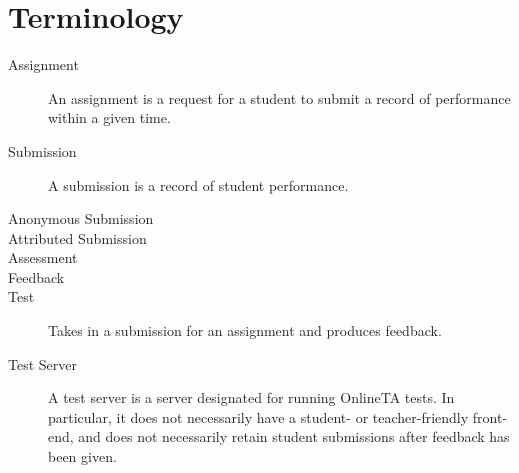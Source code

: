 \section{Terminology}

\begin{description}

\item[Assignment] An assignment is a request for a student to submit a record
of performance within a given time.

\item[Submission] A submission is a record of student performance.

\item[Anonymous Submission]

\item[Attributed Submission]

\item[Assessment]

\item[Feedback]

\item[Test] Takes in a submission for an assignment and produces feedback.

\item[Test Server] A test server is a server designated for running OnlineTA
tests. In particular, it does not necessarily have a student- or
teacher-friendly front-end, and does not necessarily retain student submissions
after feedback has been given.

\end{description}
